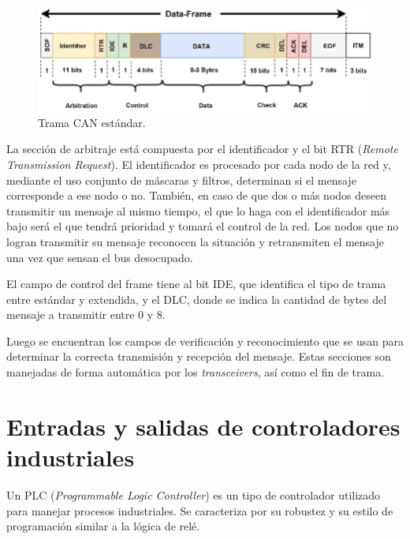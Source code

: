 \clearpage


\begin{figure}[h!]
	\centering
	\includegraphics[scale=.4]{./Figures/CANBUS-frame.png}
	\caption{Trama CAN estándar\protect\footnotemark .}
	\label{fig:trama_can}
\end{figure}


La sección de arbitraje está compuesta por el identificador y el bit RTR (\textit{Remote Transmission Request}). El identificador es procesado por cada nodo de la red y, mediante el uso conjunto de máscaras y filtros, determinan si el mensaje corresponde a ese nodo o no. También, en caso de que dos o más nodos deseen transmitir un mensaje al mismo tiempo, el que lo haga con el identificador más bajo será el que tendrá prioridad y tomará el control de la red. Los nodos que no logran transmitir su mensaje reconocen la situación y retransmiten el mensaje una vez que sensan el bus desocupado.

El campo de control del frame tiene al bit IDE, que identifica el tipo de trama entre estándar y extendida, y el DLC, donde se indica la cantidad de bytes del mensaje a transmitir entre 0 y 8.

Luego se encuentran los campos de verificación y reconocimiento que se usan para determinar la correcta transmisión y recepción del mensaje. Estas secciones son manejadas de forma automática por los \textit{transceivers}, así como el fin de trama.

\section{Entradas y salidas de controladores industriales}
\label{io_industriales}

Un PLC (\textit{Programmable Logic Controller}) es un tipo de controlador utilizado para manejar procesos industriales. Se caracteriza por su robustez y su estilo de programación similar a la lógica de relé.

